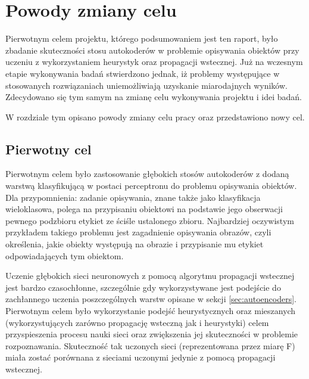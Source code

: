 \documentclass[11pt,a4paper,oneside]{report}
\begin{document}
\chapter{Powody zmiany celu}

\label{chapter:david-bowie} %




Pierwotnym celem projektu, którego podsumowaniem jest ten raport, było zbadanie skuteczności stosu autokoderów w problemie opisywania obiektów przy uczeniu z wykorzystaniem heurystyk oraz propagacji wstecznej. Już na wczesnym etapie wykonywania badań stwierdzono jednak, iż problemy występujące w stosowanych rozwiązaniach uniemożliwiają uzyskanie miarodajnych wyników. Zdecydowano się tym samym na zmianę celu wykonywania projektu i idei badań. 

W rozdziale tym opisano powody zmiany celu pracy oraz przedstawiono nowy cel.

\section{Pierwotny cel}

Pierwotnym celem było zastosowanie głębokich stosów autokoderów z dodaną warstwą klasyfikującą w postaci perceptronu do problemu opisywania obiektów. Dla przypomnienia: zadanie opisywania, znane także jako klasyfikacja wieloklasowa, polega na przypisaniu obiektowi na podstawie jego obserwacji pewnego podzbioru etykiet ze ściśle ustalonego zbioru. Najbardziej oczywistym przykładem takiego problemu jest zagadnienie opisywania obrazów, czyli określenia, jakie obiekty występują na obrazie i przypisanie mu etykiet odpowiadających tym obiektom. 

Uczenie głębokich sieci neuronowych z pomocą algorytmu propagacji wstecznej jest bardzo czasochłonne, szczególnie gdy wykorzystywane jest podejście do zachłannego uczenia poszczególnych warstw opisane w sekcji \ref{sec:autoencoders}. Pierwotnym celem było wykorzystanie podejść heurystycznych oraz mieszanych (wykorzystujących zarówno propagację wsteczną jak i heurystyki) celem przyspieszenia procesu nauki sieci oraz zwiększenia jej skuteczności w problemie rozpoznawania. Skuteczność tak uczonych sieci (reprezentowana przez miarę F) miała zostać porównana z sieciami uczonymi jedynie z pomocą propagacji wstecznej.
\end{document}
